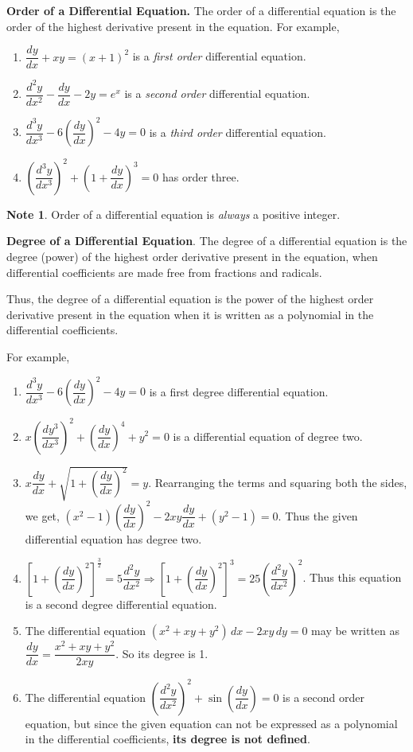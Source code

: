 \documentclass{book}
\theoremstyle{definition}
\newtheorem*{note}{Note}
\begin{document}
\textbf{Order of a Differential Equation.} The order of a differential equation is the order of the highest derivative present in the equation. For example,

\begin{enumerate}[label=(\roman*)]
    \item $\dfrac{dy}{dx}+xy=(x+1)^2$ is a \textit{first order} differential equation.
    \item $\dfrac{d^2y}{dx^2}-\dfrac{dy}{dx}-2y=e^x$ is a \textit{second order} differential equation.
    \item $\dfrac{d^3y}{dx^3}-6(\dfrac{dy}{dx})^2-4y=0$ is a \textit{third order} differential equation.
    \item $(\dfrac{d^3y}{dx^3})^2+(1+\dfrac{dy}{dx})^3=0$ has order three.
\end{enumerate}
\begin{note}
Order of a differential equation is \textit{always} a positive integer.    
\end{note}

\textbf{Degree of a Differential Equation}. The degree of a differential equation is the degree (power) of the highest order derivative present in the equation, when differential coefficients are made free from fractions and radicals.

Thus, the degree of a differential equation is the power of the highest order derivative present in the equation when it is written as a polynomial in the differential coefficients.

For example,
\begin{enumerate}[label=(\roman*)] 
\item $\dfrac{d^3y}{dx^3}-6(\dfrac{dy}{dx})^2-4y=0$ is a first degree differential equation.

\item $x(\dfrac{dy^3}{dx^3})^2+(\dfrac{dy}{dx})^4+y^2=0$ is a differential equation of degree two.
    
\item $x\dfrac{dy}{dx}+\sqrt{1+(\dfrac{dy}{dx})^2}=y$. Rearranging the terms and squaring both the sides, we get,
    $(x^2-1)\left(\dfrac{dy}{dx}\right)^2-2xy\dfrac{dy}{dx}+(y^2-1)=0$. Thus the given differential equation has degree two.
    
\item $\left[1+\left(\dfrac{dy}{dx}\right)^2\right]^{\frac{3}{2}}=5\dfrac{d^2y}{dx^2} \Rightarrow \left[1+\left(\dfrac{dy}{dx}\right)^2\right]^3=25\left(\dfrac{d^2y}{dx^2}\right)^2$. Thus this equation is a second degree differential equation.

\item The differential equation $(x^2+xy+y^2)\,dx-2xy\,dy=0$ may be written as $\dfrac{dy}{dx}=\dfrac{x^2+xy+y^2}{2xy}$. So its degree is 1.

\item The differential equation $\left(\dfrac{d^2y}{dx^2}\right)^2+\sin \left(\dfrac{dy}{dx}\right)=0$ is a second order equation, but since the given equation can not be expressed as a polynomial in the differential coefficients, \textbf{its degree is not defined}.
\end{enumerate}
\end{document}
